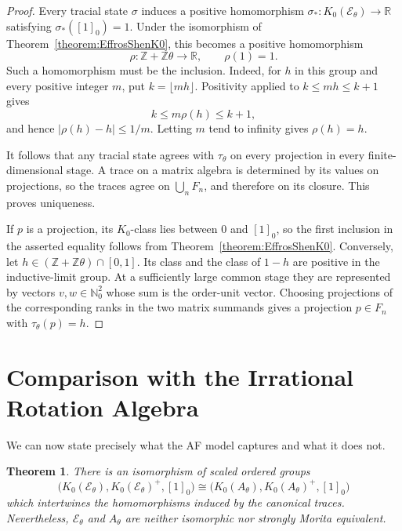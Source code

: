 \documentclass{book}
\newtheorem{theorem}[definition]{Theorem}
\begin{document}
\begin{proof}
  Every tracial state \(\sigma\) induces a positive homomorphism
  \(\sigma_*\colon K_0(\mathcal E_\theta)\to\mathbb R\) satisfying
  \(\sigma_*([1]_0)=1\).  Under the isomorphism of
  Theorem~\ref{theorem:EffrosShenK0}, this becomes a positive homomorphism
  \[
    \rho\colon\mathbb Z+\mathbb Z\theta\longrightarrow\mathbb R,
    \qquad \rho(1)=1.
  \]
  Such a homomorphism must be the inclusion.  Indeed, for \(h\) in this
  group and every positive integer \(m\), put \(k=\lfloor mh\rfloor\).
  Positivity applied to
  \(k\leq mh\leq k+1\) gives
  \[
    k\leq m\rho(h)\leq k+1,
  \]
  and hence \(|\rho(h)-h|\leq1/m\).  Letting \(m\) tend to infinity gives
  \(\rho(h)=h\).

  It follows that any tracial state agrees with \(\tau_\theta\) on every
  projection in every finite-dimensional stage.  A trace on a matrix
  algebra is determined by its values on projections, so the traces agree
  on \(\bigcup_nF_n\), and therefore on its closure.  This proves
  uniqueness.

  If \(p\) is a projection, its \(K_0\)-class lies between \(0\) and
  \([1]_0\), so the first inclusion in the asserted equality follows from
  Theorem~\ref{theorem:EffrosShenK0}.  Conversely, let
  \(h\in(\mathbb Z+\mathbb Z\theta)\cap[0,1]\).  Its class and the class of
  \(1-h\) are positive in the inductive-limit group.  At a sufficiently
  large common stage they are represented by vectors \(v,w\in\mathbb N_0^2\)
  whose sum is the order-unit vector.  Choosing projections of the
  corresponding ranks in the two matrix summands gives a projection
  \(p\in F_n\) with \(\tau_\theta(p)=h\).
\end{proof}

\section{Comparison with the Irrational Rotation Algebra}

We can now state precisely what the AF model captures and what it does not.

\begin{theorem}\label{theorem:EffrosShenRotationComparison}
  There is an isomorphism of scaled ordered groups
  \[
    \bigl(K_0(\mathcal E_\theta),K_0(\mathcal E_\theta)^+,[1]_0\bigr)
    \cong
    \bigl(K_0(A_\theta),K_0(A_\theta)^+,[1]_0\bigr)
  \]
  which intertwines the homomorphisms induced by the canonical traces.
  Nevertheless, \(\mathcal E_\theta\) and \(A_\theta\) are neither
  isomorphic nor strongly Morita equivalent.
\end{theorem}
\end{document}
